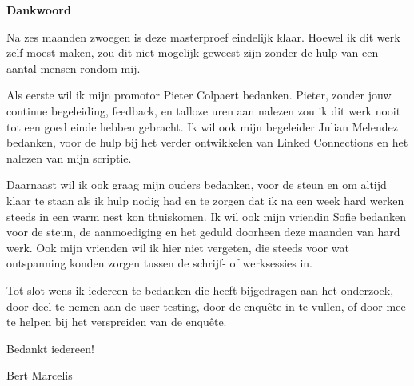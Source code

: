 \thispagestyle{empty}    %
\begin{center}
\textbf{Dankwoord}
\end{center}

Na zes maanden zwoegen is deze masterproef eindelijk klaar. Hoewel ik dit werk zelf moest maken, zou dit niet mogelijk geweest zijn zonder de hulp van een aantal mensen rondom mij. 

Als eerste wil ik mijn promotor Pieter Colpaert bedanken. Pieter, zonder jouw continue begeleiding, feedback, en talloze uren aan nalezen zou ik dit werk nooit tot een goed einde hebben gebracht. Ik wil ook mijn begeleider Julian Melendez bedanken, voor de hulp bij het verder ontwikkelen van Linked Connections en het nalezen van mijn scriptie.

Daarnaast wil ik ook graag mijn ouders bedanken, voor de steun en om altijd klaar te staan als ik hulp nodig had en te zorgen dat ik na een week hard werken steeds in een warm nest kon thuiskomen. Ik wil ook mijn vriendin Sofie bedanken voor de steun, de aanmoediging en het geduld doorheen deze maanden van hard werk. Ook mijn vrienden wil ik hier niet vergeten, die steeds voor wat ontspanning konden zorgen tussen de schrijf- of werksessies in.

Tot slot wens ik iedereen te bedanken die heeft bijgedragen aan het onderzoek, door deel te nemen aan de user-testing, door de enquête in te vullen, of door mee te helpen bij het verspreiden van de enquête.

Bedankt iedereen!

Bert Marcelis
